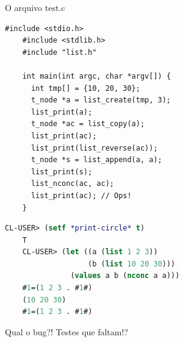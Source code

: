 \documentclass{beamer}
\begin{document}
\begin{frame}{O arquivo test.c}

  \begin{lstlisting}[style=normalc, caption=src/list-test.c]
    #include <stdio.h>
    #include <stdlib.h>
    #include "list.h"
    
    int main(int argc, char *argv[]) {
      int tmp[] = {10, 20, 30};
      t_node *a = list_create(tmp, 3);
      list_print(a);
      t_node *ac = list_copy(a);
      list_print(ac);
      list_print(list_reverse(ac));
      t_node *s = list_append(a, a); 
      list_print(s);
      list_nconc(ac, ac);
      list_print(ac); // Ops!
    }
  \end{lstlisting}

  \framebreak

  \begin{lstlisting}[style=code,language=lisp]
    CL-USER> (setf *print-circle* t)
    T
    CL-USER> (let ((a (list 1 2 3))
                   (b (list 10 20 30)))
               (values a b (nconc a a)))
    #1=(1 2 3 . #1#)
    (10 20 30)
    #1=(1 2 3 . #1#)
  \end{lstlisting}

  Qual o bug?! Testes que faltam!?
  
\end{frame}
\end{document}
